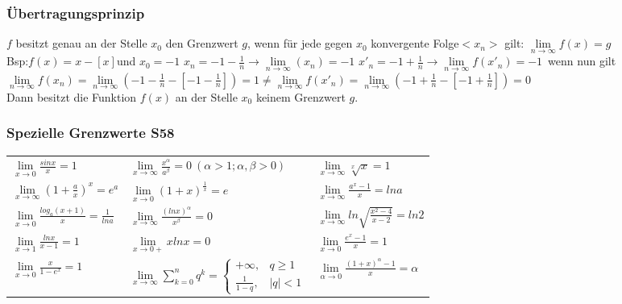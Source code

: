 \documentclass[6pt,a4paper]{scrartcl}
\begin{document}
\begin{multicols*}{2}
\begin{multicols}{2}
\end{multicols}

\subsubsection{Übertragungsprinzip}
$f$ besitzt genau an der Stelle $x_{0}$ den Grenzwert $g$, wenn für jede gegen $x_{0}$ konvergente Folge$<x_{n}>$ gilt: $\lim\limits_{n\to\infty}f(x)=g$\\
Bsp:$f(x)=x-[x]$und $x_{0}=-1$ \qquad\qquad $x_{n}=-1-\frac{1}{n}\rightarrow \lim\limits_{n\to\infty}(x_{n})=-1$ \qquad\qquad $x'_{n}= -1+\frac{1}{n}\rightarrow \lim\limits_{n\to\infty}f(x'_{n})=-1$\
wenn nun gilt\\
$ \lim\limits_{n\to\infty}f(x_{n})= \lim\limits_{n\to\infty}(-1-\frac{1}{n}-[-1-\frac{1}{n}])=1\neq \lim\limits_{n\to\infty}f(x'_{n})=\lim\limits_{n\to\infty}(-1+\frac{1}{n}-[-1+\frac{1}{n}])=0$\\
Dann besitzt die Funktion $f(x)$ an der Stelle $x_{0}$ keinem Grenzwert $g$.

\subsubsection{Spezielle Grenzwerte \color{red}S58}

\begin{tabulary}{14cm}{LLL}
	
	$\lim\limits_{x\to 0}\frac{sinx}{x}=1$							& $\lim\limits_{x\to\infty}\frac{x^{\alpha}}{a^{\beta}}=0 \ (\alpha>1;\alpha,\beta>0)$ 	& 
	$\lim\limits_{x\to\infty}\sqrt[x]{x}=1$\\
	
	$\lim\limits_{x\to\infty}\left(1+\frac{a}{x}\right)^{x}=e^{a}$	& $\lim\limits_{x\to 0}(1+x)^{\frac{1}{x}}=e$ 											& 	$\lim\limits_{x\to\infty}\frac{a^{x}-1}{x}=lna$		\\ 
	
	$\lim\limits_{x\to 0}\frac{log_{a}(x+1)}{x}=\frac{1}{ln a}$ 	& $\lim\limits_{x\to\infty}\frac{(lnx)^{\alpha}}{x^{\beta}}=0$ 							& 				$\lim\limits_{x\to\infty}ln\sqrt{\frac{x^{2}-4}{x-2}}=ln2$	\\
	
	$\lim\limits_{x\to 1}\frac{lnx}{x-1}=1$ 						& $\lim\limits_{x\to 0+}x ln x=0$ 														&
	$\lim\limits_{x\to 0}\frac{e^{x}-1}{x}=1$\\
	
	$\lim\limits_{x\to 0}\frac{x}{1-e^{x}}=1$						& $\lim\limits_{x\to \infty} \sum\limits_{k=0}^{n} q^{k} = \begin{cases} +\infty, 		& 
	q \geq 1 \\ \frac{1}{1-q},& |q|<1 \end{cases}  $ &	
	$\lim\limits_{\alpha \to0}\frac{(1+x)^{\alpha}-1}{x}=\alpha$				\\
	

\end{tabulary}
\end{multicols*}
\end{document}
